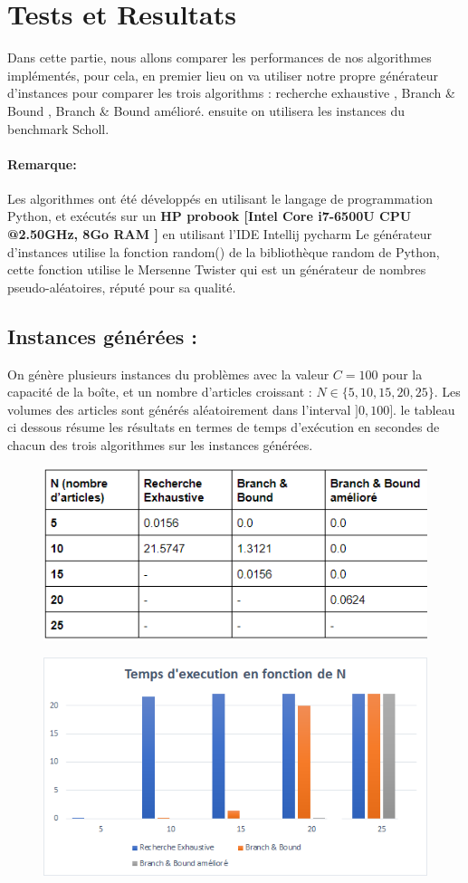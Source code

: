 \documentclass[12pt]{article}
\begin{document}
\section{Tests et Resultats}
Dans cette partie, nous allons comparer les performances de nos algorithmes implémentés, pour cela, en premier lieu on va utiliser notre propre générateur d’instances pour comparer les trois algorithms : recherche exhaustive , Branch \& Bound , Branch \& Bound amélioré. ensuite on utilisera les instances du benchmark Scholl. 
\paragraph*{Remarque: } Les algorithmes ont été développés en utilisant le langage de programmation Python, et exécutés sur un \textbf{HP probook [Intel Core i7-6500U CPU @2.50GHz, 8Go RAM ]} en utilisant l'IDE Intellij pycharm
Le générateur d’instances utilise la fonction random() de la bibliothèque random de Python, cette fonction utilise le Mersenne Twister qui est un générateur de nombres pseudo-aléatoires, réputé pour sa qualité.
\subsection{Instances générées : }
On génère plusieurs instances du problèmes avec la valeur \(C=100\) pour la capacité de la boîte, et un nombre d’articles croissant : \( N \in \{5,10,15,20,25\}\). Les volumes des articles sont générés aléatoirement dans l’interval \(]0,100]\). le tableau ci dessous résume les résultats en termes de temps d'exécution en secondes de chacun des trois algorithmes sur les instances générées. 
\begin{figure}[H]
    \includegraphics[width=13.5cm]{../figures/tab1.png}
\end{figure}
\begin{figure}[H]
    \includegraphics[width=13.5cm]{../figures/graph1.png}
\end{figure}
\end{document}
